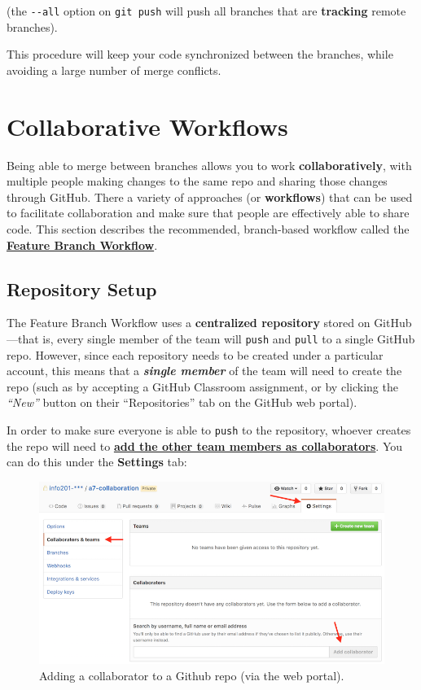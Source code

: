 \documentclass[]{book}
\theoremstyle{definition}
\theoremstyle{definition}
\theoremstyle{remark}
\begin{document}
(the \texttt{-\/-all} option on \texttt{git\ push} will push all
branches that are \textbf{tracking} remote branches).

This procedure will keep your code synchronized between the branches,
while avoiding a large number of merge conflicts.

\section{Collaborative Workflows}\label{collaborative-workflows}

Being able to merge between branches allows you to work
\textbf{collaboratively}, with multiple people making changes to the
same repo and sharing those changes through GitHub. There a variety of
approaches (or \textbf{workflows}) that can be used to facilitate
collaboration and make sure that people are effectively able to share
code. This section describes the recommended, branch-based workflow
called the
\href{https://www.atlassian.com/git/tutorials/comparing-workflows\#feature-branch-workflow}{\textbf{Feature
Branch Workflow}}.

\subsection{Repository Setup}\label{repository-setup}

The Feature Branch Workflow uses a \textbf{centralized repository}
stored on GitHub---that is, every single member of the team will
\texttt{push} and \texttt{pull} to a single GitHub repo. However, since
each repository needs to be created under a particular account, this
means that a \textbf{\emph{single member}} of the team will need to
create the repo (such as by accepting a GitHub Classroom assignment, or
by clicking the \emph{``New''} button on their ``Repositories'' tab on
the GitHub web portal).

In order to make sure everyone is able to \texttt{push} to the
repository, whoever creates the repo will need to
\href{https://help.github.com/articles/inviting-collaborators-to-a-personal-repository/}{\textbf{add
the other team members as collaborators}}. You can do this under the
\textbf{Settings} tab:

\begin{figure}
\centering
\includegraphics{img/git-branches/add-collaborator.png}
\caption{Adding a collaborator to a Github repo (via the web portal).}
\end{figure}
\end{document}
